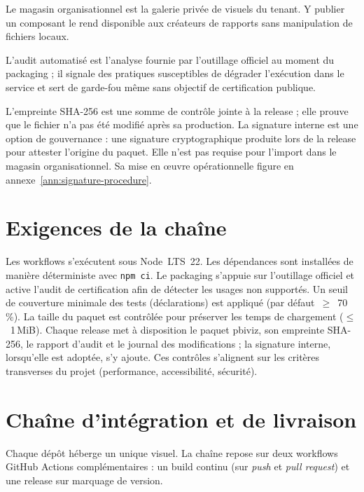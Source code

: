 Le magasin organisationnel est la galerie privée de visuels du tenant. Y publier un composant le rend disponible aux créateurs de rapports sans manipulation de fichiers locaux.

L’audit automatisé est l’analyse fournie par l’outillage officiel au moment du packaging ; il signale des pratiques susceptibles de dégrader l’exécution dans le service et sert de garde-fou même sans objectif de certification publique.

L’empreinte SHA-256 est une somme de contrôle jointe à la release ; elle prouve que le fichier n’a pas été modifié après sa production. La signature interne est une option de gouvernance : une signature cryptographique produite lors de la release pour attester l’origine du paquet. Elle n’est pas requise pour l’import dans le magasin organisationnel. Sa mise en œuvre opérationnelle figure en annexe~\ref{ann:signature-procedure}.

\section{Exigences de la chaîne}
\label{sec:exigences-ci}

Les workflows s’exécutent sous Node~LTS~22. Les dépendances sont installées de manière déterministe avec \texttt{npm ci}. Le packaging s’appuie sur l’outillage officiel et active l’audit de certification afin de détecter les usages non supportés. Un seuil de couverture minimale des tests (déclarations) est appliqué (par défaut~\(\geq\)~70\,\%). La taille du paquet est contrôlée pour préserver les temps de chargement (\(\leq\)~1\,MiB). Chaque release met à disposition le paquet pbiviz, son empreinte SHA-256, le rapport d’audit et le journal des modifications ; la signature interne, lorsqu’elle est adoptée, s’y ajoute. Ces contrôles s’alignent sur les critères transverses du projet (performance, accessibilité, sécurité).

\section{Chaîne d’intégration et de livraison}
\label{sec:ci-cd}

Chaque dépôt héberge un unique visuel. La chaîne repose sur deux workflows GitHub Actions complémentaires : un build continu (sur \textit{push} et \textit{pull request}) et une release sur marquage de version.

